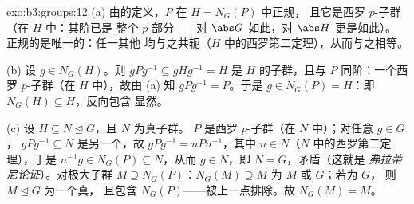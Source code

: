 \begin{solution}{exo:b3:groups:12}
(a) 由的定义，$P$ 在 $H = N_G(P)$ 中正规，
且它是西罗 $p$-子群（在 $H$ 中：其阶已是
整个 $p$-部分——对 $\abs G$ 如此，对 $\abs H$ 更是如此）。
正规的是唯一的：任一其他
均与之共轭（$H$ 中的西罗第二定理），从而与之相等。

(b) 设 $g \in N_G(H)$。则 $gPg^{-1} \subseteq gHg^{-1} = H$
是 $H$ 的子群，且与 $P$ 同阶：一个西罗
$p$-子群（在 $H$ 中），故由 (a) 知 $gPg^{-1} = P$。于是 $g \in
N_G(P) = H$：即 $N_G(H) \subseteq H$，反向包含
显然。

(c) 设 $H \subseteq N \trianglelefteq G$，且 $N$ 为真子群。
$P$ 是西罗 $p$-子群（在 $N$ 中）；对任意 $g \in G$，
$gPg^{-1} \subseteq N$ 是另一个，故 $gPg^{-1} = nPn^{-1}$，其中
$n \in N$（$N$ 中的西罗第二定理），于是 $n^{-1}g \in N_G(P)
\subseteq N$，从而 $g \in N$，即 $N = G$，矛盾（这就是
\emph{弗拉蒂尼论证}）。对极大子群 $M \supseteq
N_G(P)$：$N_G(M) \supseteq M$ 为 $M$ 或 $G$；若为 $G$，
则 $M \trianglelefteq G$ 为一个真，
且包含 $N_G(P)$——被上一点排除。故
$N_G(M) = M$。
\end{solution}

